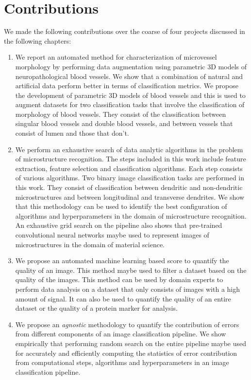\section{Contributions}
We made the following contributions over the coarse of four projects discussed in the following chapters:
\begin{enumerate}

\item We report an automated method for characterization of microvessel morphology by performing data augmentation using parametric 3D models of neuropathological blood vessels. We show that a combination of natural and artificial data perform better in terms of classification metrics.  We propose the development of parametric 3D models of blood vessels and this is used to augment datasets for two classification tasks that involve the classification of morphology of blood vessels. They consist of the classification between singular blood vessels and double blood vessels, and between vessels that consist of lumen and those that don't.

\item We perform an exhaustive search of data analytic algorithms in the problem of microstructure recognition. The steps included in this work include feature extraction, feature selection and classification algorithms. Each step consists of various algorithms. Two binary image classification tasks are performed in this work. They consist of classification between dendritic and non-dendritic microstructures and between longitudinal and transverse dendrites. We show that this methodology can be used to identify the best configuration of algorithms and hyperparameters in the domain of microstructure recognition.
An exhaustive grid search on the pipeline also shows that pre-trained convolutional neural networks maybe used to represent images of microstructures in the domain of material science.

\item We propose an automated machine learning based score to quantify the quality of an image. This method maybe used to filter a dataset based on the quality of the images. This method can be used by domain experts to perform data analysis on a dataset that only consists of images with a high amount of signal. It can also be used to quantify the quality of an entire dataset or the quality of a protein marker for analysis.

\item We propose an \textit{agnostic} methodology to quantify the contribution of errors from different components of an image classification pipeline. 
We show empirically that performing random search on the entire pipeline maybe used for accurately and efficiently computing the statistics of error contribution from computational steps, algorithms and hyperparameters in an image classification pipeline.

\end{enumerate}

